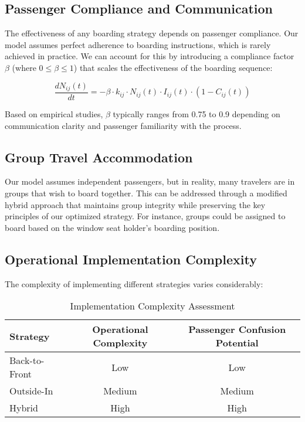 \documentclass[12pt]{article}
\begin{document}
\subsection{Passenger Compliance and Communication}

The effectiveness of any boarding strategy depends on passenger compliance. Our model assumes perfect adherence to boarding instructions, which is rarely achieved in practice. We can account for this by introducing a compliance factor $\beta$ (where $0 \leq \beta \leq 1$) that scales the effectiveness of the boarding sequence:

\begin{equation}
\frac{dN_{ij}(t)}{dt} = -\beta \cdot k_{ij} \cdot N_{ij}(t) \cdot I_{ij}(t) \cdot (1 - C_{ij}(t))
\end{equation}

Based on empirical studies, $\beta$ typically ranges from 0.75 to 0.9 depending on communication clarity and passenger familiarity with the process.

\subsection{Group Travel Accommodation}

Our model assumes independent passengers, but in reality, many travelers are in groups that wish to board together. This can be addressed through a modified hybrid approach that maintains group integrity while preserving the key principles of our optimized strategy. For instance, groups could be assigned to board based on the window seat holder's boarding position.

\subsection{Operational Implementation Complexity}

The complexity of implementing different strategies varies considerably:

\begin{table}[h]
\centering
\caption{Implementation Complexity Assessment}
\begin{tabular}{lcc}
\toprule
\textbf{Strategy} & \textbf{Operational Complexity} & \textbf{Passenger Confusion Potential} \\
\midrule
Back-to-Front & Low & Low \\
Outside-In & Medium & Medium \\
Hybrid & High & High \\
\bottomrule
\end{tabular}
\label{tab:implementation}
\end{table}
\end{document}
